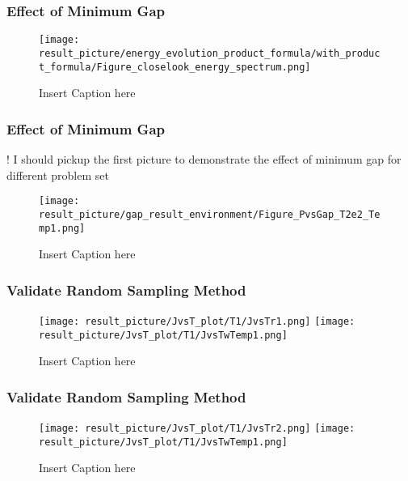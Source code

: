 \documentclass{beamer}
\begin{document}
\begin{frame}
	\frametitle{Effect of Minimum Gap}
	\begin{figure}
		\centering
		\texttt{[image: result\_picture/energy\_evolution\_product\_formula/with\_product\_formula/Figure\_closelook\_energy\_spectrum.png]}
		
		\caption{Insert Caption here}
	\end{figure}
\end{frame}

\begin{frame}
	\frametitle{Effect of Minimum Gap}
	! I should pickup the first picture to demonstrate the effect of minimum gap for different problem set
	\begin{figure}
		\centering
		\texttt{[image: result\_picture/gap\_result\_environment/Figure\_PvsGap\_T2e2\_Temp1.png]}
		
		\caption{Insert Caption here}
	\end{figure}
\end{frame}

\begin{frame}
	\frametitle{Validate Random Sampling Method}
	\begin{figure}
		\centering
		\texttt{[image: result\_picture/JvsT\_plot/T1/JvsTr1.png]}
		\hfill
		\texttt{[image: result\_picture/JvsT\_plot/T1/JvsTwTemp1.png]}		
		
		\caption{Insert Caption here}
	\end{figure}
\end{frame}

\begin{frame}
	\frametitle{Validate Random Sampling Method}
	\begin{figure}
		\centering
		\texttt{[image: result\_picture/JvsT\_plot/T1/JvsTr2.png]}
		\hfill
		\texttt{[image: result\_picture/JvsT\_plot/T1/JvsTwTemp1.png]}		
		
		\caption{Insert Caption here}
	\end{figure}
\end{frame}
\end{document}
